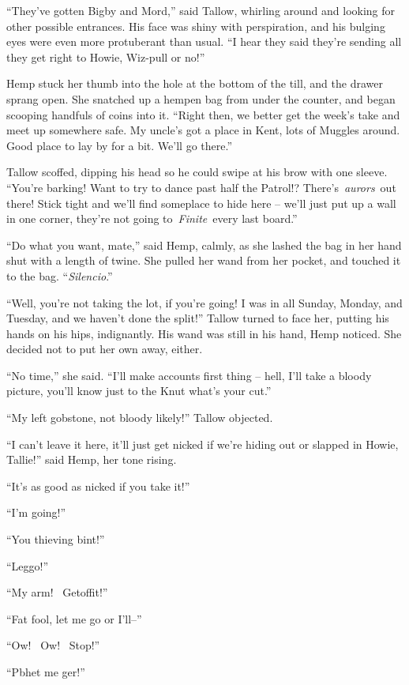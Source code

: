``They've gotten Bigby and Mord,'' said Tallow, whirling around and
looking for other possible entrances. His face was shiny with
perspiration, and his bulging eyes were even more protuberant than
usual. ``I hear they said they're sending all they get right to Howie,
Wiz-pull or no!''

Hemp stuck her thumb into the hole at the bottom of the till, and the
drawer sprang open. She snatched up a hempen bag from under the counter,
and began scooping handfuls of coins into it. ``Right then, we better
get the week's take and meet up somewhere safe. My uncle's got a place
in Kent, lots of Muggles around. Good place to lay by for a bit. We'll
go there.''

Tallow scoffed, dipping his head so he could swipe at his brow with one
sleeve. ``You're barking! Want to try to dance past half the Patrol!?
There's~\emph{aurors}~out there! Stick tight and we'll find someplace to
hide here -- we'll just put up a wall in one corner, they're not going
to~\emph{Finite}~every last board.''

``Do what you want, mate,'' said Hemp, calmly, as she lashed the bag in
her hand shut with a length of twine. She pulled her wand from her
pocket, and touched it to the bag. ``\emph{Silencio}.''

``Well, you're not taking the lot, if you're going! I was in all Sunday,
Monday, and Tuesday, and we haven't done the split!'' Tallow turned to
face her, putting his hands on his hips, indignantly. His wand was still
in his hand, Hemp noticed. She decided not to put her own away, either.

``No time,'' she said. ``I'll make accounts first thing -- hell, I'll
take a bloody picture, you'll know just to the Knut what's your cut.''

``My left gobstone, not bloody likely!'' Tallow objected.

``I can't leave it here, it'll just get nicked if we're hiding out or
slapped in Howie, Tallie!'' said Hemp, her tone rising.

``It's as good as nicked if you take it!''

``I'm going!''

``You thieving bint!''

``Leggo!''

``My arm! ~Getoffit!''

``Fat fool, let me go or I'll--''

``Ow! ~Ow! ~Stop!''

``Pbhet me ger!''


